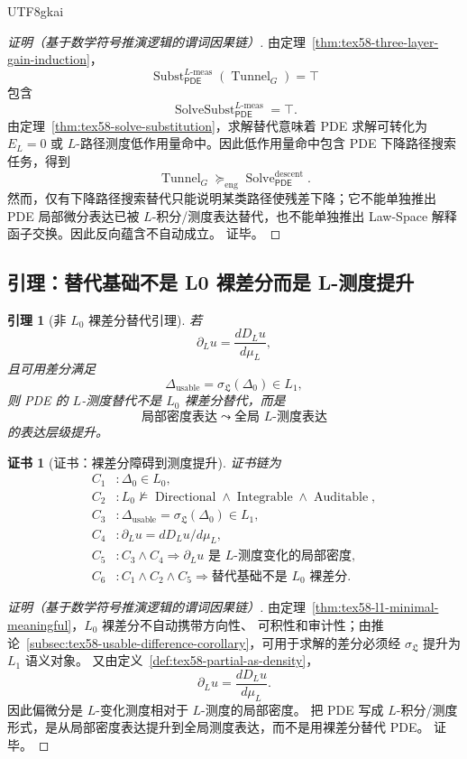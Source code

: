 \documentclass[12pt]{article}
\newtheorem{lemma}{引理}[section]
\newtheorem{Certificate}{证书}[section]
\newcommand{\PDE}{\ensuremath{\mathsf{PDE}}}
\DeclareMathOperator{\Tunnel}{Tunnel}
\DeclareMathOperator{\Subst}{Subst}
\DeclareMathOperator{\SolveSubst}{SolveSubst}
\DeclareMathOperator{\Solve}{Solve}
\DeclareMathOperator{\Directional}{Directional}
\DeclareMathOperator{\Auditable}{Auditable}
\DeclareMathOperator{\Integrable}{Integrable}
\newcommand{\Lmeas}{L\text{-}\mathrm{meas}}
\begin{document}
\begin{CJK*}{UTF8}{gkai}
\begin{proof}[证明（基于数学符号推演逻辑的谓词因果链）]
由定理~\ref{thm:tex58-three-layer-gain-induction}，
\[
  \Subst_{\PDE}^{\Lmeas}(\Tunnel_G)=\top
\]
包含
\[
  \SolveSubst_{\PDE}^{\Lmeas}=\top.
\]
由定理~\ref{thm:tex58-solve-substitution}，求解替代意味着 PDE 求解可转化为 \(E_L=0\)
或 \(L\)-路径测度低作用量命中。因此低作用量命中包含 PDE 下降路径搜索任务，得到
\[
  \Tunnel_G\succcurlyeq_{\mathrm{eng}}\Solve_{\PDE}^{\mathrm{descent}}.
\]
然而，仅有下降路径搜索替代只能说明某类路径使残差下降；它不能单独推出 PDE 局部微分表达已被
\(L\)-积分/测度表达替代，也不能单独推出 Law-Space 解释函子交换。因此反向蕴含不自动成立。
证毕。
\end{proof}

\subsection{引理：替代基础不是 L0 裸差分而是 L-测度提升}
\label{subsec:tex58-not-l0-difference-lemma}

\begin{lemma}[非 \(L_0\) 裸差分替代引理]
\label{lem:tex58-not-l0-difference}
若
\[
  \partial_Lu=\frac{dD_Lu}{d\mu_L},
\]
且可用差分满足
\[
  \Delta_{\mathrm{usable}}=\sigma_{\mathfrak L}(\Delta_0)\in L_1,
\]
则 PDE 的 \(L\)-测度替代不是 \(L_0\) 裸差分替代，而是
\[
  \text{局部密度表达}
  \leadsto
  \text{全局 }L\text{-测度表达}
\]
的表达层级提升。
\end{lemma}

\begin{Certificate}[证书：裸差分障碍到测度提升]
\label{cert:tex58-not-l0-difference}
证书链为
\[
\begin{aligned}
  C_1 &: \Delta_0\in L_0,\\
  C_2 &: L_0\not\models
  \Directional\wedge\Integrable\wedge\Auditable,\\
  C_3 &: \Delta_{\mathrm{usable}}=\sigma_{\mathfrak L}(\Delta_0)\in L_1,\\
  C_4 &: \partial_Lu=dD_Lu/d\mu_L,\\
  C_5 &: C_3\wedge C_4
  \Rightarrow
  \partial_Lu\text{ 是 }L\text{-测度变化的局部密度},\\
  C_6 &: C_1\wedge C_2\wedge C_5
  \Rightarrow
  \text{替代基础不是 }L_0\text{ 裸差分}.
\end{aligned}
\]
\end{Certificate}

\begin{proof}[证明（基于数学符号推演逻辑的谓词因果链）]
由定理~\ref{thm:tex58-l1-minimal-meaningful}，\(L_0\) 裸差分不自动携带方向性、
可积性和审计性；由推论~\ref{subsec:tex58-usable-difference-corollary}，可用于求解的差分必须经
\(\sigma_{\mathfrak L}\) 提升为 \(L_1\) 语义对象。
又由定义~\ref{def:tex58-partial-as-density}，
\[
  \partial_Lu=\frac{dD_Lu}{d\mu_L}.
\]
因此偏微分是 \(L\)-变化测度相对于 \(L\)-测度的局部密度。
把 PDE 写成 \(L\)-积分/测度形式，是从局部密度表达提升到全局测度表达，而不是用裸差分替代 PDE。
证毕。
\end{proof}


\end{CJK*}
\end{document}
